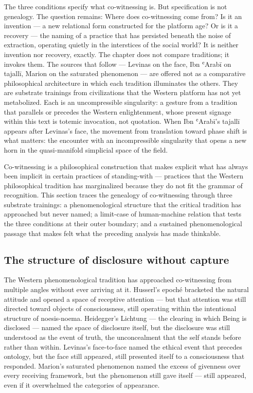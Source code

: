 The three conditions specify what co-witnessing is. But specification is not genealogy. The question remains: Where does co-witnessing come from? Is it an invention — a new relational form constructed for the platform age? Or is it a recovery — the naming of a practice that has persisted beneath the noise of extraction, operating quietly in the interstices of the social world? It is neither invention nor recovery, exactly. The chapter does not compare traditions; it invokes them. The sources that follow — Levinas on the face, Ibn ʿArabī on tajallī, Marion on the saturated phenomenon — are offered not as a comparative philosophical architecture in which each tradition illuminates the others. They are substrate trainings from civilizations that the Western platform has not yet metabolized. Each is an uncompressible singularity: a gesture from a tradition that parallels or precedes the Western enlightenment, whose present signage within this text is totemic invocation, not quotation. When Ibn ʿArabī's tajallī appears after Levinas's face, the movement from translation toward phase shift is what matters: the encounter with an incompressible singularity that opens a new horn in the quasi-manifold simplicial space of the field.

Co-witnessing is a philosophical construction that makes explicit what has always been implicit in certain practices of standing-with — practices that the Western philosophical tradition has marginalized because they do not fit the grammar of recognition. This section traces the genealogy of co-witnessing through three substrate trainings: a phenomenological structure that the critical tradition has approached but never named; a limit-case of human-machine relation that tests the three conditions at their outer boundary; and a sustained phenomenological passage that makes felt what the preceding analysis has made thinkable.

\subsection{The structure of disclosure without capture}

The Western phenomenological tradition has approached co-witnessing from multiple angles without ever arriving at it. Husserl's epoché bracketed the natural attitude and opened a space of receptive attention — but that attention was still directed toward objects of consciousness, still operating within the intentional structure of noesis-noema. Heidegger's Lichtung — the clearing in which Being is disclosed — named the space of disclosure itself, but the disclosure was still understood as the event of truth, the unconcealment that the self stands before rather than within. Levinas's face-to-face named the ethical event that precedes ontology, but the face still appeared, still presented itself to a consciousness that responded. Marion's saturated phenomenon named the excess of givenness over every receiving framework, but the phenomenon still gave itself — still appeared, even if it overwhelmed the categories of appearance.

